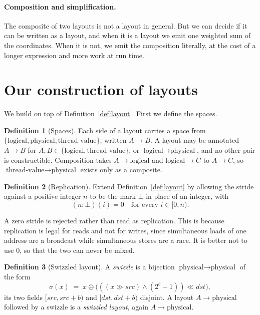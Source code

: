 \documentclass[11pt]{article}
\theoremstyle{definition}
\newtheorem{definition}{Definition}
\newcommand{\logical}{\textrm{logical}}
\newcommand{\physical}{\textrm{physical}}
\newcommand{\tv}{\textrm{thread-value}}
\begin{document}
\paragraph{Composition and simplification.} The composite of two layouts is not
a layout in general. But we can decide if it can be written as a layout, and
when it is a layout we emit one weighted sum of the coordinates. When it is
not, we emit the composition literally, at the cost of a longer expression and
more work at run time.

\section{Our construction of layouts}\label{sec:layouts}

We build on top of Definition~\ref{def:layout}. First we define the spaces.

\begin{definition}[Spaces]\label{def:spaces}
Each side of a layout carries a space from $\{\logical, \physical, \tv\}$,
written $A \to B$. A layout may be annotated $A \to B$ for
$A, B \in \{\logical, \tv\}$, or $\logical \to \physical$, and no other pair is
constructible. Composition takes $A \to \logical$ and $\logical \to C$ to
$A \to C$, so $\tv \to \physical$ exists only as a composite.
\end{definition}

\begin{definition}[Replication]\label{def:linear}
Extend Definition~\ref{def:layout} by allowing the stride against a positive
integer $n$ to be the mark $\bot$ in place of an integer, with
\[
(n{:}\bot)(i) = 0 \quad\text{for every } i \in [0,n).
\]
\end{definition}

A zero stride is rejected rather than read as replication. This is because
replication is legal for reads and not for writes, since simultaneous loads of
one address are a broadcast while simultaneous stores are a race. It is better
not to use $0$, so that the two can never be mixed.

\begin{definition}[Swizzled layout]\label{def:swizzle}
A \emph{swizzle} is a bijection $\physical \to \physical$ of the form
\[
\sigma(x) \;=\; x \oplus \big(((x \gg \mathit{src}) \wedge (2^{b}-1)) \ll
\mathit{dst}\big),
\]
its two fields $[\mathit{src},\mathit{src}{+}b)$ and
$[\mathit{dst},\mathit{dst}{+}b)$ disjoint. A layout $A \to \physical$
followed by a swizzle is a \emph{swizzled layout}, again $A \to \physical$.
\end{definition}
\end{document}
